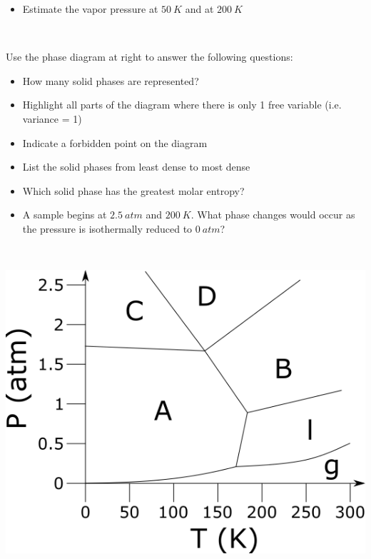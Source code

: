 \documentclass[11pt, letterpaper]{memoir}
\begin{document}
{\begin{minipage}{0.7\linewidth}
\begin{itemize}
		\vspace{2em}
		\item Estimate the vapor pressure at $50~K$ and at $200~K$ 
		
		\vspace{2em}
		~
	\end{itemize}
\end{minipage}

\vspace{2em}\noindent\hspace{-2em}
\begin{minipage}{0.7\linewidth}
	Use the phase diagram at right to answer the following questions:
	
	\noindent 
	\begin{itemize}
		\item How many solid phases are represented?
		
		\item Highlight all parts of the diagram where there is only 1 free variable (i.e. variance = 1)	
		
		\item Indicate a forbidden point on the diagram		
			
		
		\item List the solid phases from least dense to most dense
		
		\vspace{2em}
		
		\item Which solid phase has the greatest molar entropy?
		
		\vspace{2em}
		\item A sample begins at $2.5~atm$ and $200~K$. What phase changes would occur as the pressure is isothermally reduced to $0~atm$?
	\end{itemize}
\end{minipage}~
\begin{minipage}{0.4\linewidth}
	\includegraphics[width=\textwidth]{Phase_Diagram2}
\end{minipage}

}
\end{document}

